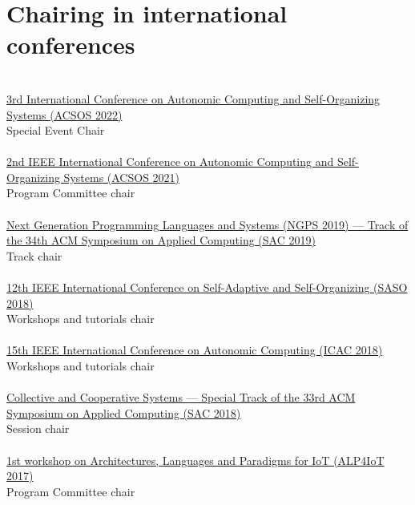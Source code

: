 \section{{\color{black}Chairing in international conferences}}
\halfblankline \\
\href{https://conf.researchr.org/home/acsos-2022/}{3rd International Conference on Autonomic Computing and Self-Organizing Systems
(ACSOS 2022)}
\\ Special Event Chair \\
\halfblankline \\
\href{https://conf.researchr.org/home/acsos-2021}{2nd IEEE International Conference on Autonomic Computing and Self-Organizing Systems 
(ACSOS 2021)}
\\ Program Committee chair \\
\halfblankline \\
\href{https://ngps2019.github.io/}{Next Generation Programming Languages and Systems (NGPS 2019) --- 
Track of the 34th ACM Symposium on Applied Computing (SAC 2019)}
\\ Track chair \\
\halfblankline \\
\href{https://saso2018.fbk.eu/}{12th IEEE International Conference on Self-Adaptive and Self-Organizing (SASO 2018)}
\\ Workshops and tutorials chair \\
\halfblankline \\
\href{http://icac2018.informatik.uni-wuerzburg.de/committees/organization-committee/}{15th IEEE International Conference on Autonomic Computing (ICAC 2018)}
\\ Workshops and tutorials chair \\
\halfblankline \\
\href{http://sac-cas2018.apice.unibo.it/referees.html}{Collective and Cooperative Systems --- Special Track of the 33rd ACM Symposium on Applied Computing (SAC 2018)}
\\ Session chair \\
\halfblankline \\
\href{http://apice.unibo.it/xwiki/bin/view/ALP4IoT2016/WebHome}{1st workshop on Architectures, Languages and Paradigms for IoT (ALP4IoT 2017)}
\\ Program Committee chair \\

